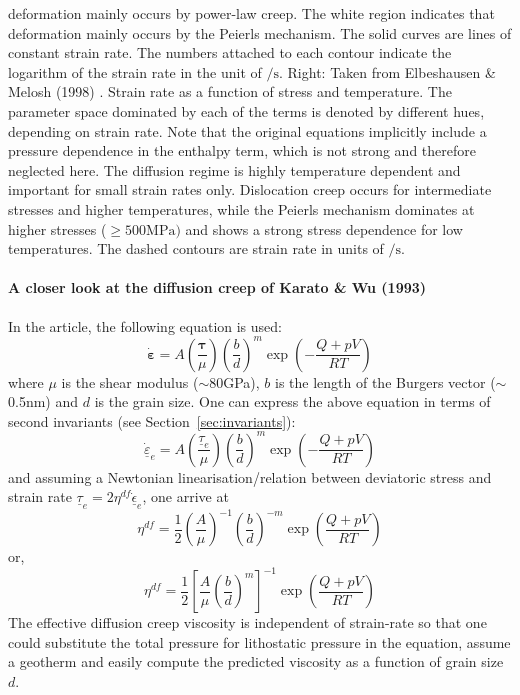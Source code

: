 \begin{center}
{deformation mainly occurs by power-law creep. 
The white region indicates that deformation mainly occurs by the Peierls mechanism. The 
solid curves are lines of constant strain rate. The numbers attached to each contour indicate the 
logarithm of the strain rate in the unit of $\si{\per\second}$.
Right: Taken from Elbeshausen \& Melosh (1998) \cite{elme18}. 
Strain rate as a function of stress and temperature. The parameter space dominated by each of 
the terms is denoted by different hues, depending on strain rate. Note that the original equations 
implicitly include a pressure dependence in the enthalpy term, which is not strong and 
therefore neglected here. The diffusion regime is highly temperature dependent and 
important for small strain rates only. Dislocation creep occurs for intermediate 
stresses and higher temperatures, while the Peierls mechanism dominates at higher stresses 
($\ge 500\si{\mega\pascal})$ and shows a strong stress dependence for low temperatures. 
The dashed contours are strain rate in units of $\si{\per\second}$. 
}
\end{center}


\paragraph{A closer look at the diffusion creep of Karato \& Wu (1993)} In the article, 
the following equation is used: 
\[
\dot{\bm \varepsilon} = 
A \left(\frac{{\bm \tau}}{\mu}\right) \left(\frac{b}{d}\right)^m \exp \left( -\frac{Q+pV}{RT}\right)
\]
where $\mu$ is the shear modulus ($\sim$80\si{\giga\pascal}), 
$b$ is the length of the Burgers vector ($\sim$0.5\si{\nano\metre}) and 
$d$ is the grain size.
One can express the above equation in terms of second invariants (see Section~\ref{sec:invariants}):
\[
\underline{\dot{\varepsilon}}_{e} 
= A \left(\frac{\underline{\tau}_{e}}{\mu}\right) \left(\frac{b}{d}\right)^m \exp\left( -\frac{Q+pV}{RT} \right)
\]
and assuming a Newtonian linearisation/relation between deviatoric stress 
and strain rate  $\underline{\tau}_{e} = 2 \eta^{df} \underline{\dot\epsilon}_{e}$, one arrive at
\[
\eta^{df} = \frac{1}{2} \left(\frac{A}{\mu}\right)^{-1}  
\left(\frac{b}{d}\right)^{-m} \exp\left( \frac{Q+pV}{RT} \right)
\]
or, 
\[
\eta^{df} = \frac{1}{2} \left[ \frac{A}{\mu}   
\left(\frac{b}{d}\right)^{m} \right]^{-1} \exp\left( \frac{Q+pV}{RT} \right)
\]
The effective diffusion creep viscosity is independent of strain-rate so that one 
could substitute the total pressure for lithostatic pressure in the equation, assume 
a geotherm and easily compute the predicted viscosity as a function of grain size $d$.


